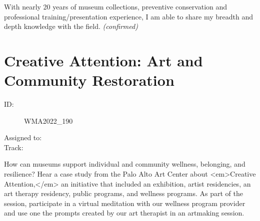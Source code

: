 \documentclass{report}
\begin{document}
                
                

                With nearly 20 years of museum collections, preventive conservation and professional training/presentation experience, I am able to share my breadth and depth knowledge with the field.
                \emph{ (confirmed) }
              

              

              

              
        
          \newpage
          \section{ Creative Attention: Art and Community Restoration }
            \begin{description}
              \item [ID:]
              WMA2022\_190

              \item [Assigned to:]
                \item [Track:]
              \end{description}

              How can museums support individual and community wellness, belonging, and resilience? Hear a case study from the Palo Alto Art Center about <em>Creative Attention,</em> an initiative that included an exhibition, artist residencies, an art therapy residency, public programs, and wellness programs. As part of the session, participate in a virtual meditation with our wellness program provider and use one the prompts created by our art therapist in an artmaking session.
\end{document}
